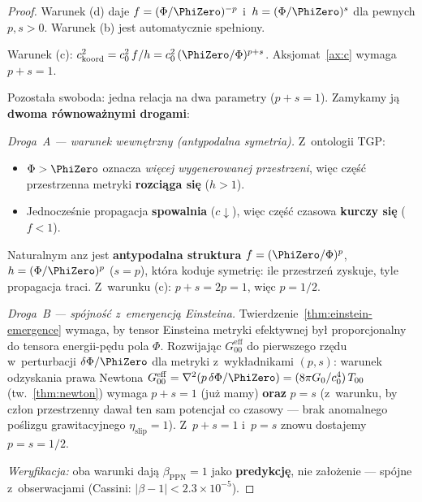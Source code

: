 \begin{proof}
Warunek (d) daje $f = (\Phi/\PhiZero)^{-p}$ i~$h = (\Phi/\PhiZero)^s$
dla pewnych $p, s > 0$. Warunek (b) jest automatycznie spe\l{}niony.

Warunek (c):
$c_{\mathrm{koord}}^2 = c_0^2\,f/h
= c_0^2\,(\PhiZero/\Phi)^{p+s}$. Aksjomat~\ref{ax:c}
wymaga $p + s = 1$.

Pozosta\l{}a swoboda: jedna relacja na dwa parametry ($p + s = 1$).
Zamykamy j\k{a} \textbf{dwoma r\'ownowa\.znymi drogami}:

\smallskip\noindent
\emph{Droga~A --- warunek wewn\k{e}trzny (antypodalna symetria).}
Z~ontologii TGP:
\begin{itemize}[nosep]
  \item $\Phi > \PhiZero$ oznacza \emph{wi\k{e}cej wygenerowanej
    przestrzeni}, wi\k{e}c cz\k{e}\'s\'c przestrzenna metryki
    \textbf{rozci\k{a}ga si\k{e}} ($h > 1$).
  \item Jednocze\'snie propagacja \textbf{spowalnia}
    ($c \downarrow$), wi\k{e}c cz\k{e}\'s\'c czasowa
    \textbf{kurczy si\k{e}} ($f < 1$).
\end{itemize}
Naturalnym anz jest \textbf{antypodalna struktura}
$f = (\PhiZero/\Phi)^p$, $h = (\Phi/\PhiZero)^p$ ($s = p$),
kt\'ora koduje symetri\k{e}: ile przestrze\'n zyskuje, tyle
propagacja traci. Z~warunku (c): $p + s = 2p = 1$, wi\k{e}c
$p = 1/2$.

\smallskip\noindent
\emph{Droga~B --- sp\'ojno\'s\'c z~emergencj\k{a} Einsteina.}
Twierdzenie~\ref{thm:einstein-emergence} wymaga, by tensor
Einsteina metryki efektywnej by\l{} proporcjonalny do tensora
energii-p\k{e}du pola $\Phi$. Rozwijaj\k{a}c $G_{00}^{\mathrm{eff}}$
do pierwszego rz\k{e}du w~perturbacji $\delta\Phi/\PhiZero$
dla metryki z~wyk\l{}adnikami $(p, s)$: warunek
odzyskania prawa Newtona $G_{00}^{\mathrm{eff}}
= \nabla^2(p\,\delta\Phi/\PhiZero) = (8\pi G_0/c_0^4)\,T_{00}$
(tw.~\ref{thm:newton}) wymaga $p + s = 1$ (ju\.z mamy)
\textbf{oraz} $p = s$ (z~warunku, by cz\l{}on przestrzenny
dawa\l{} ten sam potencja\l{} co czasowy --- brak anomalnego
po\'slizgu grawitacyjnego $\eta_{\mathrm{slip}} = 1$).
Z~$p + s = 1$ i~$p = s$ znowu dostajemy $p = s = 1/2$.

\smallskip\noindent
\emph{Weryfikacja:} oba warunki daj\k{a} $\beta_{\mathrm{PPN}} = 1$
jako \textbf{predykcj\k{e}}, nie za\l{}o\.zenie ---
sp\'ojne z~obserwacjami (Cassini: $|\beta - 1| < 2.3 \times 10^{-5}$).


\end{proof}
